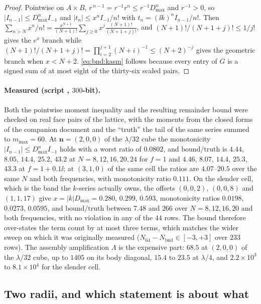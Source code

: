 \begin{proof}
Pointwise on $A\times B$, $r^{\,n-1} = r^{-1}r^{n} \le r^{-1}D_{\max}^{n}$ and
$r^{-1} > 0$, so $|I_{n-1}| \le D_{\max}^{n}I_{-1}$ and $|t_n| \le x^{n}I_{-1}/n!$ with
$t_n = (\ii k)^{n}I_{n-1}/n!$. Then
$\sum_{n>N}x^{n}/n! = \frac{x^{N+1}}{(N+1)!}\sum_{j\ge0}x^{j}\frac{(N+1)!}{(N+1+j)!}$,
and $(N+1)!/(N+1+j)! \le 1/j!$ gives the $e^{x}$ branch while
$(N+1)!/(N+1+j)! = \prod_{i=2}^{j+1}(N+i)^{-1} \le (N+2)^{-j}$ gives the geometric
branch when $x < N+2$. \eqref{eq:bnd:kasm} follows because every entry of $G$ is a signed
sum of at most eight of the thirty-six scaled pairs.
\end{proof}

\paragraph{Measured (script , $300$-bit).} Both the pointwise moment
inequality and the resulting remainder bound were checked on real face pairs of the
lattice, with the moments from the closed forms of the companion document and the
``truth'' the tail of the same series summed to $m_{\max} = 60$. At
$\mathbf{n} = (2,0,0)$ of the $\lambda/32$ cube the monotonicity
$|I_{n-1}| \le D_{\max}^{n}I_{-1}$ holds with a worst ratio of $0.0802$, and
$\mathrm{bound}/\mathrm{truth}$ is $4.44$, $8.05$, $14.4$, $25.2$, $43.2$ at
$N = 8,12,16,20,24$ for $f = 1$ and $4.46$, $8.07$, $14.4$, $25.3$, $43.3$ at
$f = 1+0.1\ii$; at $(3,1,0)$ of the same cell the ratios are $4.07$--$20.5$ over the
same $N$ and both frequencies, with monotonicity ratio $0.111$. On the slender cell,
which is the band the $k$-series actually owns, the offsets $(0,0,2)$, $(0,0,8)$ and
$(1,1,17)$ give $x = |k|D_{\max} = 0.280$, $0.299$, $0.593$, monotonicity ratios
$0.0198$, $0.0273$, $0.0595$, and $\mathrm{bound}/\mathrm{truth}$ between $7.48$ and
$266$ over $N = 8,12,16,20$ and both frequencies, with no violation in any of the $44$
rows. The bound therefore over-states the term count by at most three terms,
which matches the wider sweep on which it was originally measured
($N_{64}-N_{\mathrm{bnd}} \in [-3,+3]$ over $233$ rows). The assembly amplification
$\Lambda$ is the expensive part: $68.5$ at $(2,0,0)$ of the $\lambda/32$ cube, up to
$1405$ on its body diagonal, $15.4$ to $23.5$ at $\lambda/4$, and
$2.2\times10^{3}$ to $8.1\times10^{4}$ for the slender cell.

\subsection{Two radii, and which statement is about what}
\label{sec:bnd:radii}

